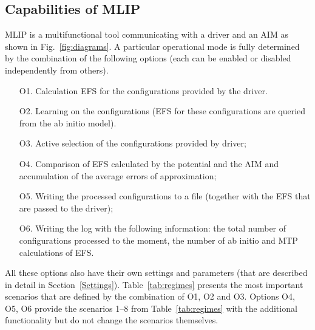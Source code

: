 \documentclass[12pt]{article}
\renewcommand{\_}{\char`_}
\begin{document}
\subsection{Capabilities of MLIP}\label{Capabilities}

MLIP is a multifunctional tool communicating with a driver and an AIM as shown in Fig.\ \ref{fig:diagrams}.
A particular operational mode is fully determined by the combination of the following options (each can be enabled or disabled independently from others).
\begin{itemize}
	\item[O1.] Calculation EFS for the configurations provided by the driver.
	\item[O2.] Learning on the configurations (EFS for these configurations are queried from the ab initio model).
	\item[O3.] Active selection of the configurations provided by driver;
	\item[O4.] Comparison of EFS calculated by the potential and the AIM and accumulation of the average errors of approximation;
	\item[O5.] Writing the processed configurations to a file (together with the EFS that are passed to the driver);
	\item[O6.] Writing the log with the following information: the total number of configurations processed to the moment, the number of ab initio and MTP calculations of EFS.
\end{itemize}
All these options also have their own settings and parameters (that are described in detail in Section~\ref{Settings}).
Table~\ref{tab:regimes} presents the most important scenarios that are defined by the combination of O1, O2 and O3. Options O4, O5, O6 provide the scenarios 1--8 from Table~\ref{tab:regimes} with the additional functionality but do not change the scenarios themselves.
\end{document}
